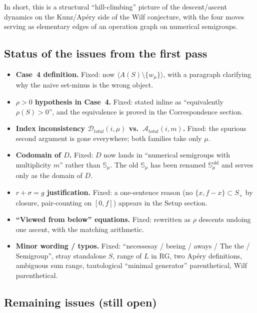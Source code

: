 \documentclass[11pt, a4paper]{article}
\begin{document}
In short, this is a structural ``hill-climbing'' picture of the
descent/ascent dynamics on the Kunz/Apéry side of the Wilf
conjecture, with the four moves serving as elementary edges of an
operation graph on numerical semigroups.

\subsection*{Status of the issues from the first pass}

\begin{itemize}
    \item \textbf{Case~4 definition.} Fixed: now $\langle A(S) \setminus
    \{w_\mu\}\rangle$, with a paragraph clarifying why the
    naive set-minus is the wrong object.
    \item \textbf{$\rho > 0$ hypothesis in Case~4.} Fixed: stated
    inline as ``equivalently $\rho(S) > 0$'', and the equivalence
    is proved in the Correspondence section.
    \item \textbf{Index inconsistency $\mathcal{D}_{total}(i,\mu)$
    vs.\ $\mathcal{A}_{total}(i,m)$.} Fixed: the spurious second
    argument is gone everywhere; both families take only $\mu$.
    \item \textbf{Codomain of $D$.} Fixed: $D$ now lands in
    ``numerical semigroups with multiplicity $m$'' rather than
    $\mathbb{S}_\mu$. The old $\mathbb{S}_\mu$ has been renamed
    $\mathbb{S}_\mu^{\mathrm{old}}$ and serves only as the
    domain of $D$.
    \item \textbf{$r + \sigma = g$ justification.} Fixed: a
    one-sentence reason (no $\{x, f-x\} \subset S_+$ by closure,
    pair-counting on $[0,f]$) appears in the Setup section.
    \item \textbf{``Viewed from below'' equations.} Fixed: rewritten
    as $\rho$ descents undoing one ascent, with the matching
    arithmetic.
    \item \textbf{Minor wording / typos.} Fixed: ``necessesay /
    beeing / aways / The the / Semigroup'', stray standalone $S$,
    range of $L$ in RG, two Apéry definitions, ambiguous sum
    range, tautological ``minimal generator'' parenthetical, Wilf
    parenthetical.
\end{itemize}

\subsection*{Remaining issues (still open)}
\end{document}
